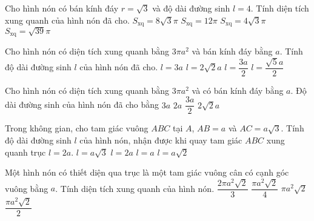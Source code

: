 \begin{ex}
	[Mã 104 2017]%
	Cho hình nón có bán kính đáy $r=\sqrt{3}$ và độ dài đường sinh $l=4$. Tính diện tích xung quanh của hình nón đã cho. 
	\choice
	{$S_{\mathrm{xq}}=8\sqrt{3}\pi$}
	{$S_{\mathrm{xq}}=12\pi$}
	{\True $S_{\mathrm{xq}}=4\sqrt{3}\pi$}
	{$S_{\mathrm{xq}}=\sqrt{39}\pi$}
\end{ex}
\begin{ex}
	Cho hình nón có diện tích xung quanh bằng $3\pi a^2$ và bán kính đáy bằng $a$. Tính độ dài đường sinh $l$ của hình nón đã cho. 
	\choice
	{\True $l=3a$}
	{$l=2\sqrt{2}a$}
	{$l=\dfrac{3a}{2}$}
	{$l=\dfrac{\sqrt{5}a}{2}$}
\end{ex}
\begin{ex}
	Cho hình nón có diện tích xung quanh bằng $3\pi a^2$ và có bán kính đáy bằng $a$. Độ dài đường sinh của hình nón đã cho bằng 
	\choice
	{\True $3a$}
	{$2a$}
	{$\dfrac{3a}{2}$}
	{$2\sqrt{2}a$}
\end{ex}
\begin{ex}
	Trong không gian, cho tam giác vuông $ABC$ tại $A$, $AB=a$ và $AC=a\sqrt{3}$. Tính độ dài đường sinh $l$ của hình nón, nhận được khi quay tam giác $ABC$ xung quanh trục $l=2a$. 
	\choice
	{$l=a\sqrt{3}$}
	{\True $l=2a$}
	{$l=a$}
	{$l=a\sqrt{2}$}
\end{ex}
\begin{ex}
	Một hình nón có thiết diện qua trục là một tam giác vuông cân có cạnh góc vuông bằng $a$. Tính diện tích xung quanh của hình nón. 
	\choice
	{$\dfrac{2\pi a^2\sqrt{2}}{3}$}
	{$\dfrac{\pi a^2\sqrt{2}}{4}$}
	{$\pi a^2\sqrt{2}$}
	{\True $\dfrac{\pi a^2\sqrt{2}}{2}$}
\end{ex}
